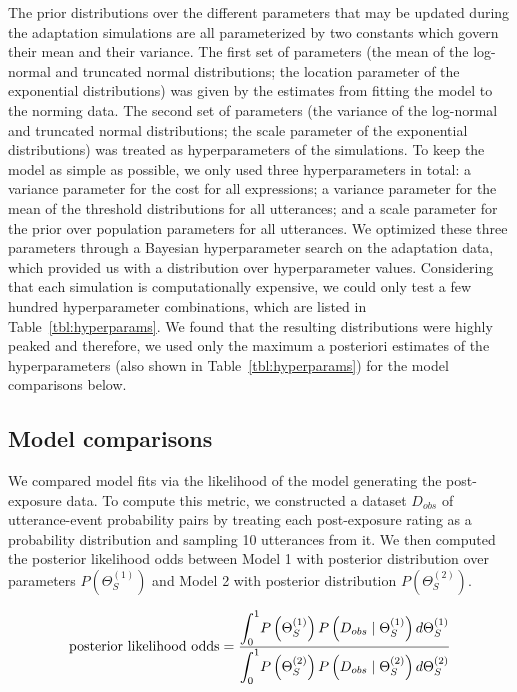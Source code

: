 The prior distributions over the different parameters that may be updated during the adaptation simulations are all parameterized by two constants which govern their mean and their variance. The first set of parameters (the mean of the log-normal and truncated normal distributions; the location parameter of the exponential distributions) was given by the estimates from fitting the model to the norming data. The second set of parameters (the variance of the log-normal and truncated normal distributions; the scale parameter of the exponential distributions) was treated as hyperparameters of the simulations. To keep the model as simple as possible, we only used three hyperparameters in total: a variance parameter for the cost for all expressions; a variance parameter for the mean of the threshold distributions for all utterances; and a scale parameter for the prior over population parameters for all utterances. We optimized these three parameters through a Bayesian hyperparameter search on the adaptation data, which provided us with a distribution over hyperparameter values. Considering that each simulation is computationally expensive, we could only test a few hundred hyperparameter combinations, which are listed in Table~\ref{tbl:hyperparams}. We found that the resulting distributions were highly peaked and therefore, we used only the maximum a posteriori estimates of the hyperparameters (also shown in Table~\ref{tbl:hyperparams}) for the model comparisons below.


\subsection{Model comparisons}

We compared model fits via the likelihood of the model generating the post-exposure data. To compute this metric, we constructed a dataset $D_{obs}$ of utterance-event probability pairs by treating each post-exposure rating as a probability distribution and sampling 10 utterances from it. We then computed the posterior likelihood odds between Model 1 with posterior distribution over parameters $P(\Theta_{S}^{(1)})$ and Model 2 with posterior distribution $P(\Theta_{S}^{(2)})$.

$$\mbox{posterior likelihood odds} = \frac{\mathlarger{\int_{0}^{1}} {P\left(\Theta_{S}^{(1)}\right) P\left(D_{obs} \mid \Theta_{S}^{(1)} \right) d   \Theta_{S}^{(1)}}}{\mathlarger{\int_0^1} P\left(\Theta_{S}^{(2)}\right) P\left(D_{obs} \mid \Theta_{S}^{(2)}\right)d   \Theta_{S}^{(2)} }$$
 
